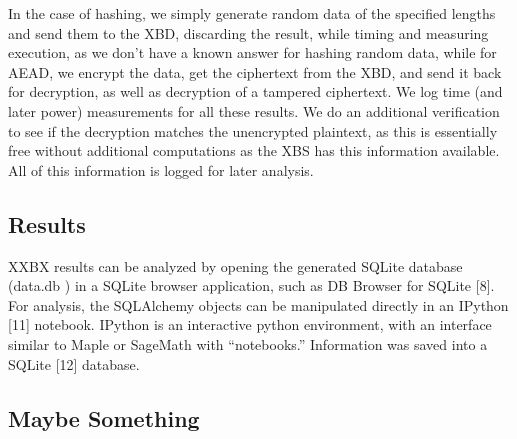 \documentclass[twoside,11pt]{cergdoc}
\begin{document}
In the case of hashing, we simply generate random data of the specified lengths
and send them to the XBD, discarding the result, while timing and measuring
execution, as we don't have a known answer
for hashing random data, while for AEAD, we encrypt the data, get the ciphertext
from the XBD, and send it back for decryption, as well as decryption of a
tampered ciphertext. We log time (and later power) measurements for all these
results. We do an additional verification to see if the decryption matches the
unencrypted plaintext, as this is essentially free without additional
computations as the XBS has this information available.  All of this information
is logged for later analysis. 


  \section{Results}
XXBX results can be analyzed by
opening the generated SQLite database
(data.db ) in a SQLite browser application,
such as DB Browser for SQLite [8]. For
analysis, the SQLAlchemy objects can be
manipulated directly in an IPython [11]
notebook. IPython is an interactive python
environment, with an interface similar to
Maple or SageMath with “notebooks.”
Information was saved into a SQLite [12]
database.


\begin{appendix}
\chapter{Maybe Something}
\end{appendix}
\end{document}

